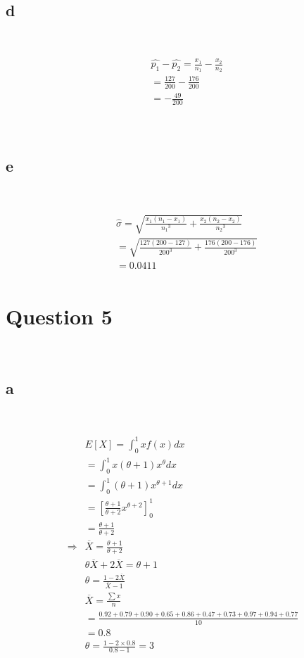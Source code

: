 \documentclass{article}
\begin{document}
~

\subsection*{d}

~

\begin{align*}
    &\hat{p_1}-\hat{p_2}=\frac{x_1}{n_1}-\frac{x_2}{n_2}\\
    &=\frac{127}{200}-\frac{176}{200}\\
    &=-\frac{49}{200}\\
\end{align*}

~

\subsection*{e}

~

\begin{align*}
    &\hat{\sigma}=\sqrt{\frac{x_1(n_1-x_1)}{{n_1}^3}+\frac{x_2(n_2-x_2)}{{n_2}^3}}\\
    &=\sqrt{\frac{127(200-127)}{200^3}+\frac{176(200-176)}{200^3}}\\
    &=0.0411\\
\end{align*}

\newpage

\section*{Question 5}

~

\subsection*{a}

~

\begin{align*}
    &E[X]=\int_{0}^{1}xf(x)dx\\
    &=\int_{0}^{1}x(\theta+1)x^\theta dx\\
    &=\int_{0}^{1}(\theta+1)x^{\theta+1}dx\\
    &=\left[\frac{\theta+1}{\theta+2}x^{\theta+2}\right]^1_0\\
    &=\frac{\theta+1}{\theta+2}\\
    \Rightarrow&\overline{X}=\frac{\theta+1}{\theta+2}\\
    &\theta\overline{X}+2\overline{X}=\theta+1\\
    &\theta=\frac{1-2\overline{X}}{\overline{X}-1}\\
    &\overline{X}=\frac{\sum x}{n}\\
    &=\frac{0.92+0.79+0.90+0.65+0.86+0.47+0.73+0.97+0.94+0.77}{10}\\
    &=0.8\\
    &\theta=\frac{1-2\times0.8}{0.8-1}=3\\
\end{align*}
\end{document}
